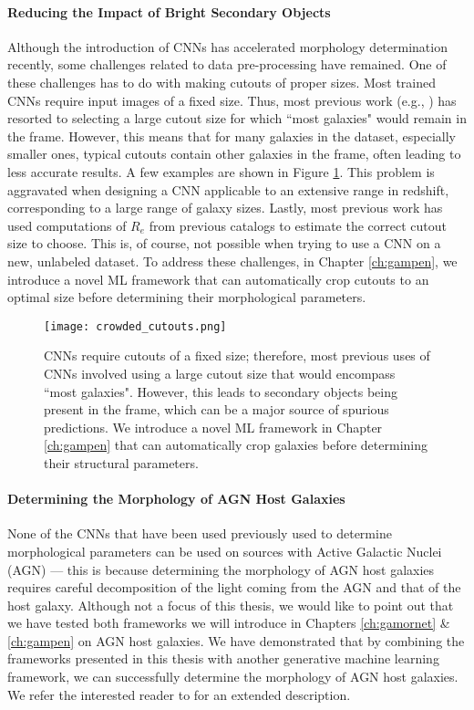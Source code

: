 \paragraph{Reducing the Impact of Bright Secondary Objects} Although the introduction of CNNs has accelerated morphology determination recently, some challenges related to data pre-processing have remained. One of these challenges has to do with making cutouts of proper sizes. Most trained CNNs require input images of a fixed size. Thus, most previous work (e.g., \citealp{Cheng2021GalaxyNetworks, Vega-Ferrero2021PushingSurvey}) has resorted to selecting a large cutout size for which ``most galaxies" would remain in the frame. However, this means that for many galaxies in the dataset, especially smaller ones, typical cutouts contain other galaxies in the frame, often leading to less accurate results. A few examples are shown in Figure \ref{fig_intro:crowded_cutouts}. This problem is aggravated when designing a CNN applicable to an extensive range in redshift, corresponding to a large range of galaxy sizes. Lastly, most previous work has used computations of $R_e$ from previous catalogs to estimate the correct cutout size to choose. This is, of course, not possible when trying to use a CNN on a new, unlabeled dataset. To address these challenges, in Chapter \ref{ch:gampen}, we introduce a novel ML framework that can automatically crop cutouts to an optimal size before determining their morphological parameters. 

\begin{figure}[htbp]
    \centering
    \texttt{[image: crowded\_cutouts.png]}
    \caption{CNNs require cutouts of a fixed size; therefore, most previous uses of CNNs involved using a large cutout size that would encompass ``most galaxies". However, this leads to secondary objects being present in the frame, which can be a major source of spurious predictions. We introduce a novel ML framework in Chapter \ref{ch:gampen} that can automatically crop galaxies before determining their structural parameters.}
    \label{fig_intro:crowded_cutouts}
\end{figure}


\paragraph{Determining the Morphology of AGN Host Galaxies} None of the CNNs that have been used previously used to determine morphological parameters can be used on sources with Active Galactic Nuclei (AGN) --- this is because determining the morphology of AGN host galaxies requires careful decomposition of the light coming from the AGN and that of the host galaxy. Although not a focus of this thesis, we would like to point out that we have tested both frameworks we will introduce in Chapters \ref{ch:gamornet} \& \ref{ch:gampen} on AGN host galaxies. We have demonstrated that by combining the frameworks presented in this thesis with another generative machine learning framework, we can successfully determine the morphology of AGN host galaxies. We refer the interested reader to \citet{tian_23} for an extended description.

